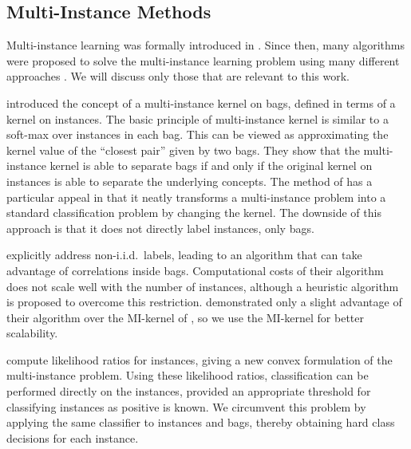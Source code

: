 \documentclass{llncs} %
\begin{document}
\subsection{Multi-Instance Methods}
Multi-instance learning was formally introduced in \citet{dietterich1997solving}.
Since then, many algorithms were proposed to solve the multi-instance learning problem
using many different approaches \citep{andrews2003support,gaertner2002multi,zhou2009multi,li2009convex,zhang2002dd,mangasarian2008multiple,leistner2010miforests,chen2006miles}.
We will discuss only those that are relevant to this work.

\citet{gaertner2002multi} introduced the concept of a multi-instance
kernel on bags, defined in terms of a kernel on instances. 
The basic principle of multi-instance kernel is similar to a soft-max over instances in
each bag. This can be viewed as approximating the kernel value of the ``closest pair'' given by two bags. They show that the multi-instance kernel
is able to separate bags if and only if the original kernel on instances is able to separate the underlying concepts.
The method of \citet{gaertner2002multi} has a particular appeal in that it neatly transforms a multi-instance problem into a standard
classification problem by changing the kernel. The downside of this approach is that it does
not directly label instances, only bags.

\citet{zhou2009multi} explicitly address non-i.i.d.\  labels, leading to an algorithm that can take
advantage of correlations inside bags. Computational costs of their algorithm does not scale well with
the number of instances, although a heuristic algorithm is proposed to overcome this restriction.
\citet{zhou2009multi} demonstrated only a slight advantage of their algorithm over the MI-kernel of \citet{gaertner2002multi}, so
we use the MI-kernel for better scalability.

\citet{liconvex2010} compute likelihood ratios for instances, giving a new convex formulation of the multi-instance problem.
Using these likelihood ratios, classification can be performed directly on the instances, provided an appropriate
threshold for classifying instances as positive is known.
We circumvent this problem by applying the same classifier to instances and bags, thereby obtaining hard class
decisions for each instance.
\end{document}
